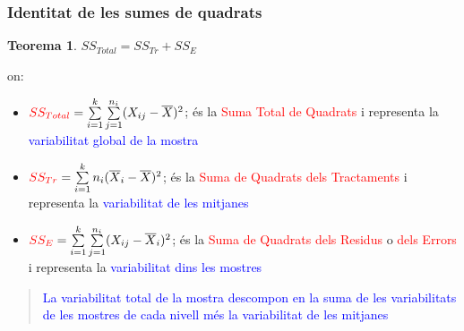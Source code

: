 \documentclass[12pt,t]{beamer}
\newcommand{\red}[1]{\textcolor{red}{#1}}
\newcommand{\blue}[1]{\textcolor{blue}{#1}}
\theoremstyle{plain}
\newtheorem{teorema}{Teorema}
\theoremstyle{definition}
\begin{document}
%
%
%
%
%
%
\begin{frame}
\frametitle{Identitat de les sumes de quadrats}\vspace*{-2ex}

\begin{teorema}
$SS_{Total}=SS_{Tr}+SS_E$
\end{teorema}

on:\vspace*{-2ex}

\begin{itemize}
\item $\red{SS_{Total}}=\sum\limits_{i=1}^k\sum\limits_{j=1}^{n_i} (X_{ij}-\overline{X})^2$; és la \red{Suma Total de Quadrats} i representa la \blue{variabilitat global de la mostra}

\item $\red{SS_{Tr}}=\sum\limits_{i=1}^k n_i
(\overline{X}_{i}-\overline{X})^2$; és la \red{Suma de Quadrats dels Tractaments} i representa la \blue{variabilitat de les mitjanes} 

\item $\red{SS_E}=\sum\limits_{i=1}^k\sum\limits_{j=1}^{n_i} (X_{ij}-\overline{X}_{i})^2$; és la \red{Suma de Quadrats dels Residus} o \red{dels Errors} i representa la \blue{variabilitat dins les mostres}
\end{itemize}\pause

\begin{quote}
\blue{La variabilitat total de la mostra descompon en la suma de les variabilitats de les mostres de cada nivell més la variabilitat de les mitjanes}
\end{quote}

\end{frame}
\end{document}
